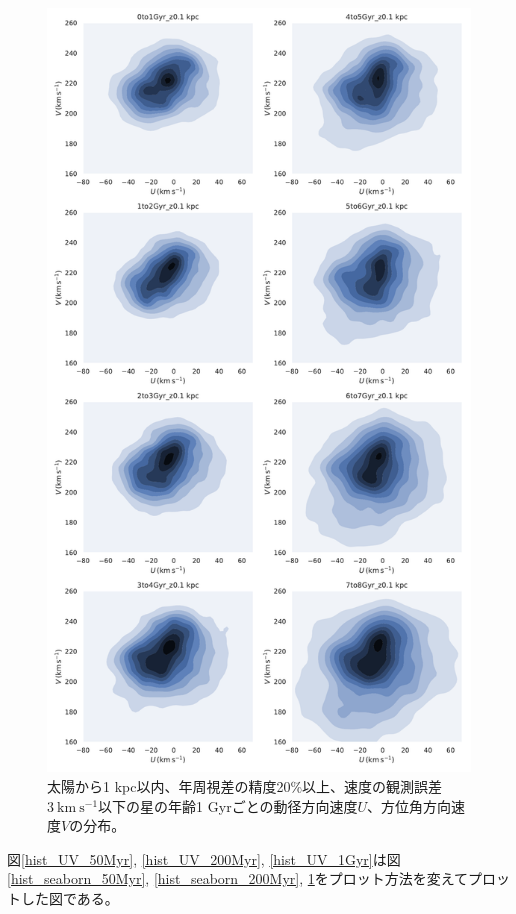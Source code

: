 \begin{figure}[htbp]
\begin{center}
	\includegraphics[width=12cm]{fig/UV/hist_seaborn_0_z0.1kpc.pdf}
	\caption{太陽から1 kpc以内、年周視差の精度20\%以上、速度の観測誤差$3\ \mathrm{km\ s^{-1}}$以下の星の年齢1 Gyrごとの動径方向速度$U$、方位角方向速度$V$の分布。}
	\label{hist_seaborn_1Gyr}
\end{center}
\end{figure}

図\ref{hist_UV_50Myr}, \ref{hist_UV_200Myr}, \ref{hist_UV_1Gyr}は図\ref{hist_seaborn_50Myr}, \ref{hist_seaborn_200Myr}, \ref{hist_seaborn_1Gyr}をプロット方法を変えてプロットした図である。

